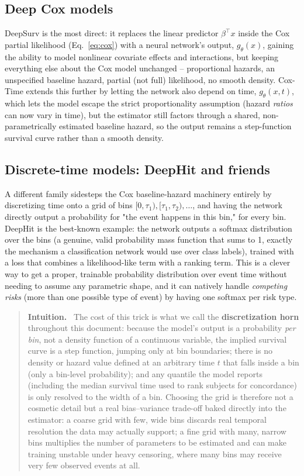 \documentclass[11pt]{article}
\newenvironment{intuition}
  {\par\addvspace{8pt}\begin{quote}\noindent\textbf{\textcolor{blue!40!black}{Intuition.}}\ }
  {\end{quote}\par\addvspace{8pt}}
\begin{document}
\subsection{Deep Cox models}
DeepSurv \citep{katzman2018deepsurv} is the most direct: it replaces the
linear predictor $\beta^\top x$ inside the Cox partial likelihood
(Eq.~\eqref{eq:cox}) with a neural network's output, $g_\theta(x)$,
gaining the ability to model nonlinear covariate effects and
interactions, but keeping everything else about the Cox model unchanged
-- proportional hazards, an unspecified baseline hazard, partial (not
full) likelihood, no smooth density. Cox-Time \citep{kvamme2019coxtime}
extends this further by letting the network also depend on time,
$g_\theta(x, t)$, which lets the model escape the strict proportionality
assumption (hazard \emph{ratios} can now vary in time), but the
estimator still factors through a shared, non-parametrically estimated
baseline hazard, so the output remains a step-function survival curve
rather than a smooth density.

\subsection{Discrete-time models: DeepHit and friends}
\label{sec:deephit}
A different family sidesteps the Cox baseline-hazard machinery entirely
by discretizing time onto a grid of bins $[0, \tau_1), [\tau_1, \tau_2),
\ldots$, and having the network directly output a probability for
"the event happens in this bin," for every bin. DeepHit
\citep{lee2018deephit} is the best-known example: the network outputs a
softmax distribution over the bins (a genuine, valid probability mass
function that sums to 1, exactly the mechanism a classification network
would use over class labels), trained with a loss that combines a
likelihood-like term with a ranking term. This is a clever way to get a
proper, trainable probability distribution over event time without
needing to assume any parametric shape, and it can natively handle
\emph{competing risks} (more than one possible type of event) by having
one softmax per risk type.

\begin{intuition}
The cost of this trick is what we call the \textbf{discretization horn}
throughout this document: because the model's output is a probability
\emph{per bin}, not a density function of a continuous variable, the
implied survival curve is a step function, jumping only at bin
boundaries; there is no density or hazard value defined at an arbitrary
time $t$ that falls inside a bin (only a bin-level probability); and any
quantile the model reports (including the median survival time used to
rank subjects for concordance) is only resolved to the width of a bin.
Choosing the grid is therefore not a cosmetic detail but a real
bias--variance trade-off baked directly into the estimator: a coarse
grid with few, wide bins discards real temporal resolution the data may
actually support; a fine grid with many, narrow bins multiplies the
number of parameters to be estimated and can make training unstable
under heavy censoring, where many bins may receive very few observed
events at all.
\end{intuition}
\end{document}
